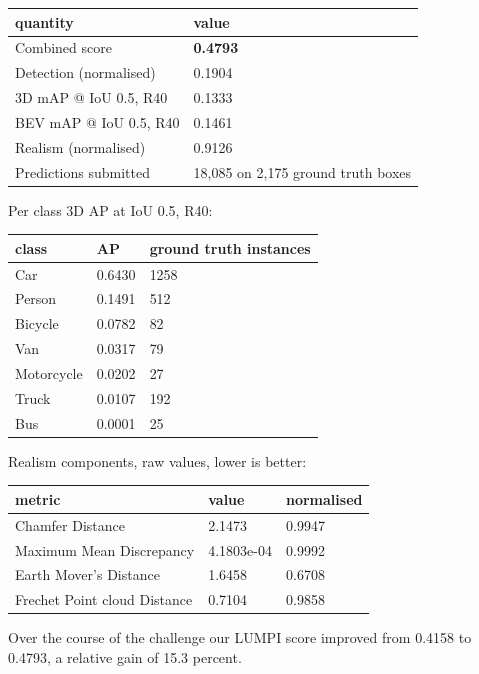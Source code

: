 \documentclass[
  10pt,
]{article}
\newcounter{none} %
\begin{document}
{\def\LTcaptype{none} %
\begin{longtable}[]{@{}ll@{}}
\toprule\noalign{}
quantity & value \\
\midrule\noalign{}
\endhead
\bottomrule\noalign{}
\endlastfoot
Combined score & \textbf{0.4793} \\
Detection (normalised) & 0.1904 \\
3D mAP @ IoU 0.5, R40 & 0.1333 \\
BEV mAP @ IoU 0.5, R40 & 0.1461 \\
Realism (normalised) & 0.9126 \\
Predictions submitted & 18,085 on 2,175 ground truth boxes \\
\end{longtable}
}

Per class 3D AP at IoU 0.5, R40:

{\def\LTcaptype{none} %
\begin{longtable}[]{@{}lll@{}}
\toprule\noalign{}
class & AP & ground truth instances \\
\midrule\noalign{}
\endhead
\bottomrule\noalign{}
\endlastfoot
Car & 0.6430 & 1258 \\
Person & 0.1491 & 512 \\
Bicycle & 0.0782 & 82 \\
Van & 0.0317 & 79 \\
Motorcycle & 0.0202 & 27 \\
Truck & 0.0107 & 192 \\
Bus & 0.0001 & 25 \\
\end{longtable}
}

Realism components, raw values, lower is better:

{\def\LTcaptype{none} %
\begin{longtable}[]{@{}lll@{}}
\toprule\noalign{}
metric & value & normalised \\
\midrule\noalign{}
\endhead
\bottomrule\noalign{}
\endlastfoot
Chamfer Distance & 2.1473 & 0.9947 \\
Maximum Mean Discrepancy & 4.1803e-04 & 0.9992 \\
Earth Mover's Distance & 1.6458 & 0.6708 \\
Frechet Point cloud Distance & 0.7104 & 0.9858 \\
\end{longtable}
}

Over the course of the challenge our LUMPI score improved from 0.4158 to
0.4793, a relative gain of 15.3 percent.
\end{document}
